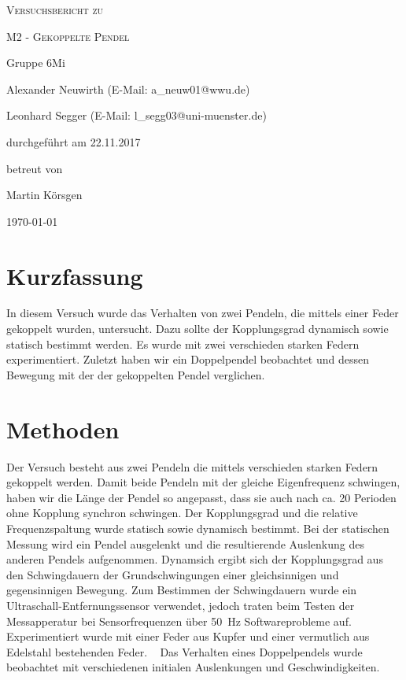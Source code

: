 \documentclass[
	a4paper,
	12pt,
	pagesize,
	ngerman
]{scrartcl}
\begin{document}
	
	\begin{titlepage}
		\centering
		{\scshape\LARGE Versuchsbericht zu \par}
		\vspace{1cm}
		{\scshape\huge M2 - Gekoppelte Pendel\par}
		\vspace{2.5cm}
		{\LARGE Gruppe 6Mi \par}
		\vspace{0.5cm}
		
		{\large Alexander Neuwirth (E-Mail: a\_neuw01@wwu.de) \par}
		{\large Leonhard Segger (E-Mail: l\_segg03@uni-muenster.de) \par}
		\vfill
		
		durchgeführt am 22.11.2017\par
		betreut von\par
		{\large Martin Körsgen}
		
		\vfill
		
		{\large \today\par}
	\end{titlepage}
	\tableofcontents
	\newpage
	
	\section{Kurzfassung}
	In diesem Versuch wurde das Verhalten von zwei Pendeln, die mittels einer Feder gekoppelt wurden, untersucht. Dazu sollte der Kopplungsgrad dynamisch sowie statisch bestimmt werden.
	Es wurde mit zwei verschieden starken Federn experimentiert.
	Zuletzt haben wir ein Doppelpendel beobachtet und dessen Bewegung mit der der gekoppelten Pendel verglichen.

	\section{Methoden}
	Der Versuch besteht aus zwei Pendeln die mittels verschieden starken Federn gekoppelt werden. Damit beide Pendeln mit der gleiche Eigenfrequenz schwingen, haben wir die Länge der Pendel so angepasst, dass sie auch nach ca. 20 Perioden ohne Kopplung synchron schwingen. Der Kopplungsgrad und die relative Frequenzspaltung wurde statisch sowie dynamisch bestimmt. Bei der statischen Messung wird ein Pendel ausgelenkt und die resultierende Auslenkung des anderen Pendels aufgenommen. Dynamsich ergibt sich der Kopplungsgrad aus den Schwingdauern der Grundschwingungen einer gleichsinnigen und gegensinnigen Bewegung.	Zum Bestimmen der Schwingdauern wurde ein Ultraschall-Entfernungssensor verwendet, jedoch traten beim Testen der Messapperatur bei Sensorfrequenzen über \SI{50}{Hz} Softwareprobleme auf.
Experimentiert wurde mit einer Feder aus Kupfer und einer vermutlich aus Edelstahl bestehenden Feder.
    
	\noindent{}Das Verhalten eines Doppelpendels wurde beobachtet mit verschiedenen initialen Auslenkungen und Geschwindigkeiten. 
	
\end{document}
